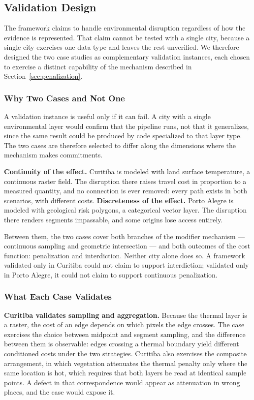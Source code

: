 \subsection{Validation Design}
\label{subsec:validation}

The framework claims to handle environmental disruption regardless of how the evidence is represented. That claim cannot be tested with a single city, because a single city exercises one data type and leaves the rest unverified. We therefore designed the two case studies as complementary validation instances, each chosen to exercise a distinct capability of the mechanism described in Section~\ref{sec:penalization}.

\subsubsection{Why Two Cases and Not One}

A validation instance is useful only if it can fail. A city with a single environmental layer would confirm that the pipeline runs, not that it generalizes, since the same result could be produced by code specialized to that layer type. The two cases are therefore selected to differ along the dimensions where the mechanism makes commitments.

\textbf{Continuity of the effect.} Curitiba is modeled with land surface temperature, a continuous raster field. The disruption there raises travel cost in proportion to a measured quantity, and no connection is ever removed: every path exists in both scenarios, with different costs. \textbf{Discreteness of the effect.} Porto Alegre is modeled with geological risk polygons, a categorical vector layer. The disruption there renders segments impassable, and some origins lose access entirely.

Between them, the two cases cover both branches of the modifier mechanism — continuous sampling and geometric intersection — and both outcomes of the cost function: penalization and interdiction. Neither city alone does so. A framework validated only in Curitiba could not claim to support interdiction; validated only in Porto Alegre, it could not claim to support continuous penalization.

\subsubsection{What Each Case Validates}

\textbf{Curitiba validates sampling and aggregation.} Because the thermal layer is a raster, the cost of an edge depends on which pixels the edge crosses. The case exercises the choice between midpoint and segment sampling, and the difference between them is observable: edges crossing a thermal boundary yield different conditioned costs under the two strategies. Curitiba also exercises the composite arrangement, in which vegetation attenuates the thermal penalty only where the same location is hot, which requires that both layers be read at identical sample points. A defect in that correspondence would appear as attenuation in wrong places, and the case would expose it.

